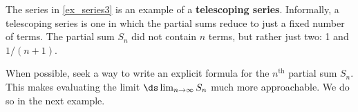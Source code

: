 The series in \autoref{ex_series3} is an example of a \textbf{telescoping series}. Informally, a telescoping series is one in which the partial sums reduce to just a fixed number of terms. The partial sum $S_n$ did not contain $n$ terms, but rather just two: 1 and $1/(n+1)$.

When possible, seek a way to write an explicit formula for the $n^\text{th}$ partial sum $S_n$. This makes evaluating the limit $\ds\lim_{n\to\infty} S_n$ much more approachable. We do so in the next example.




